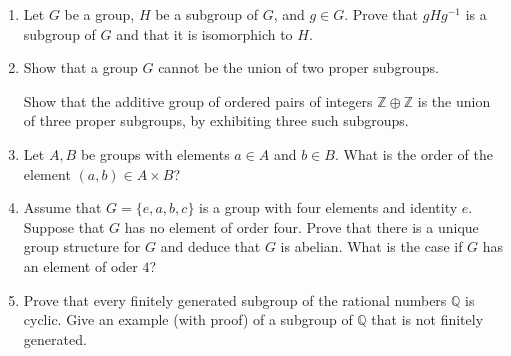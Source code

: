 \documentclass[12pt]{article}
\newcommand{\QQ}{{\mathbb Q}}
\newcommand{\ZZ}{{\mathbb Z}}
\begin{document}
\begin{enumerate}

\item  Let $G$ be a group, $H$ be a subgroup of $G$, and $g\in G$.
       Prove that $gHg^{-1}$ is a subgroup of $G$ and that it is isomorphich to $H$.

 
\item      Show that a group $G$ cannot be the union of two proper subgroups.

  
  Show that the additive group of ordered pairs of integers $\ZZ\oplus\ZZ$ is the union of three proper subgroups,
  by exhibiting three such subgroups.
 


 
\item Let $A,B$ be groups with elements $a\in A$ and $b\in B$.
      What is the order of the element $(a,b)\in A\times B$?


\item Assume that $G=\{e,a,b,c\}$ is a group with four elements and identity $e$.
      Suppose that $G$ has no element of order four.
      Prove that there is a unique group structure for $G$ and deduce that $G$ is  abelian.
      What is the case if $G$ has an element of oder $4$?


\item 
    Prove that every finitely generated subgroup of the rational numbers $\QQ$ is cyclic.
      Give an example (with proof) of a subgroup of $\QQ$ that is not finitely generated.






\end{enumerate}
\end{document}
